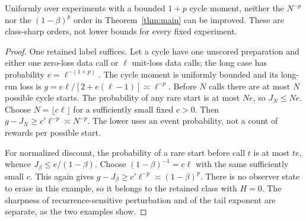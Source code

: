 \begin{proposition}\label{prop:tailsharp}
Uniformly over experiments with a bounded $1+p$ cycle moment, neither the $N^{-p}$ nor the $(1-\beta)^p$ order in Theorem~\ref{thm:main} can be improved. These are class-sharp orders, not lower bounds for every fixed experiment.
\end{proposition}
\begin{proof}
One retained label suffices. Let a cycle have one unscored preparation and either one zero-loss data call or $\ell$ unit-loss data calls; the long case has probability $e=\ell^{-(1+p)}$. The cycle moment is uniformly bounded and its long-run loss is $g=e\ell/[2+e(\ell-1)]\asymp\ell^{-p}$. Before $N$ calls there are at most $N$ possible cycle starts. The probability of any rare start is at most $Ne$, so $J_N\le Ne$. Choose $N=\lfloor c\ell\rfloor$ for a sufficiently small fixed $c>0$. Then $g-J_N\ge c'\ell^{-p}\asymp N^{-p}$. The lower uses an event probability, not a count of rewards per possible start.

For normalized discount, the probability of a rare start before call $t$ is at most $te$, whence
$J_\beta\le e/(1-\beta)$. Choose $(1-\beta)^{-1}=c\ell$ with the same sufficiently small $c$. This again gives $g-J_\beta\ge c'\ell^{-p}\asymp(1-\beta)^p$. There is no observer state to erase in this example, so it belongs to the retained class with $H=0$. The sharpness of recurrence-sensitive perturbation and of the tail exponent are separate, as the two examples show.
\end{proof}
